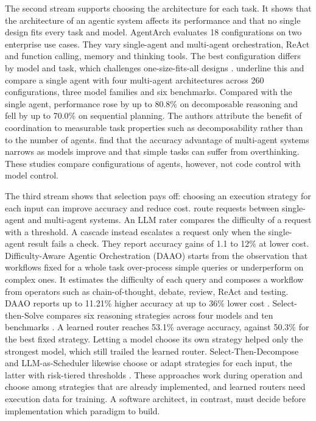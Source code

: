 The second stream supports choosing the architecture for each task. It shows that the architecture of an agentic system affects its performance and that no single design fits every task and model. AgentArch evaluates 18 configurations on two enterprise use cases. They vary single-agent and multi-agent orchestration, ReAct and function calling, memory and thinking tools. The best configuration differs by model and task, which challenges one-size-fits-all designs \parencite{bogavelliAgentArchComprehensiveBenchmark2025}. \textcite{kimScienceScalingAgent2025} underline this and compare a single agent with four multi-agent architectures across 260 configurations, three model families and six benchmarks. Compared with the single agent, performance rose by up to 80.8\% on decomposable reasoning and fell by up to 70.0\% on sequential planning. The authors attribute the benefit of coordination to measurable task properties such as decomposability rather than to the number of agents. \textcite{gaoSingleagentMultiagentSystems2025} find that the accuracy advantage of multi-agent systems narrows as models improve and that simple tasks can suffer from overthinking. These studies compare configurations of agents, however, not code control with model control.
 
The third stream shows that selection pays off: choosing an execution strategy for each input can improve accuracy and reduce cost. \textcite{gaoSingleagentMultiagentSystems2025} route requests between single-agent and multi-agent systems. An LLM rater compares the difficulty of a request with a threshold. A cascade instead escalates a request only when the single-agent result fails a check. They report accuracy gains of 1.1 to 12\% at lower cost. Difficulty-Aware Agentic Orchestration (DAAO) starts from the observation that workflows fixed for a whole task over-process simple queries or underperform on complex ones. It estimates the difficulty of each query and composes a workflow from operators such as chain-of-thought, debate, review, ReAct and testing. DAAO reports up to 11.21\% higher accuracy at up to 36\% lower cost \parencite{suDifficultyAwareAgenticOrchestration2025}. Select-then-Solve compares six reasoning strategies across four models and ten benchmarks \parencite{zhouSelectthenSolveParadigmRouting2026}. A learned router reaches 53.1\% average accuracy, against 50.3\% for the best fixed strategy. Letting a model choose its own strategy helped only the strongest model, which still trailed the learned router. Select-Then-Decompose and LLM-as-Scheduler likewise choose or adapt strategies for each input, the latter with risk-tiered thresholds \parencite{liuSelectThenDecomposeEmpiricalAnalysis2025,xiangLLMasSchedulerAgenticWorkflow2026}. These approaches work during operation and choose among strategies that are already implemented, and learned routers need execution data for training. A software architect, in contrast, must decide before implementation which paradigm to build.
 
